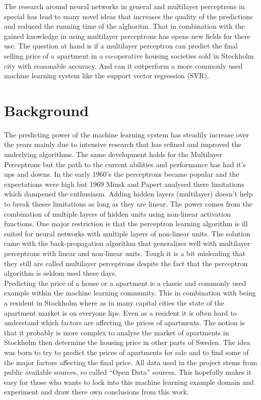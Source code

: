 
The research around neural networks in general and multilayer perceptrons in special has lead to many novel ideas that increases the quality of the predictions and reduced the running time of the alghoritm. That in combination with the gained knowledge in using multilayer perceptrons has opens new fields for there use. The question at hand is if a multilayer perceptron can predict the final selling price of a apartment in a co-operative housing societies sold in Stockholm city with reasonable accuracy. And can it outperform a more commonly used machine learning system like the support vector regression (SVR).
   

\section{Background}
The predicting power of the machine learning system has steadily increase over the years mainly due to intensive research that has refined and improved the underlying algorithms. The same development holds for the Multilayer Perceptrons but the path to the current abilities and performance has had it's ups and downs. In the early 1960's the perceptrons became popular and the expectations were high but 1969 Minsk and Papert analysed there limitations which dampened the enthusiasm. Adding hidden layers (multilayer) doesn't help to break theses limitations as long as they are linear. The power comes from the combination of multiple layers of hidden units using non-linear activation functions. One major restriction is that the perceptron learning algorithm is ill suited for neural networks with multiple layers of non-linear units. The solution came with the back-propagation algorithm that generalizes well with multilayer perceptrons with linear and non-linear units. Tough it is a bit misleading that they still are called multilayer perceptrons despite the fact that the perceptron algorithm is seldom used these days.
\\
Predicting the price of a house or a apartment is a classic and commonly used example within the machine learning community. This in combination with being a resident in Stockholm where as in many capital cities the state of the apartment market is on everyone lips. Even as a resident it is often hard to understand which factors are affecting the prices of apartments. The notion is that it probably is more complex to analyse the market of apartments in Stockholm then determine the housing price in other parts of Sweden. The idea was born to try to predict the prices of apartments for sale and to find some of the major factors affecting the final price. All data used in the project stems from public available sources, so called ``Open Data'' sources. This hopefully makes it easy for those who wants to lock into this machine learning example domain and experiment and draw there own conclusions from this work.
